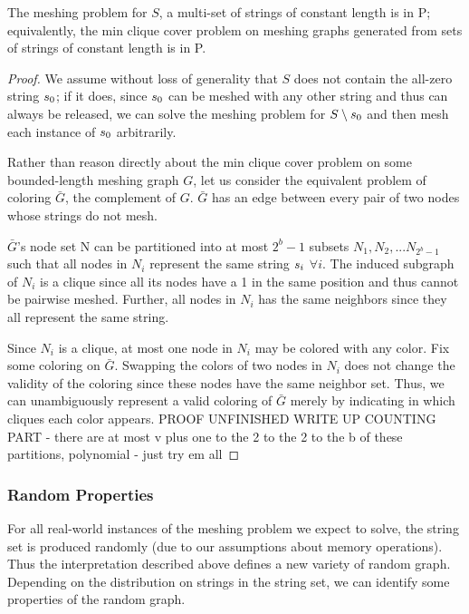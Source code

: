 \begin{theorem}
The meshing problem for $S$, a multi-set of strings of constant length is in P; equivalently, the min clique cover problem on meshing graphs generated from sets of strings of constant length is in P.
\end{theorem}
\begin{proof}
We assume without loss of generality that $S$ does not contain the all-zero string $s_0$; if it does, since $s_0$ can be meshed with any other string and thus can always be released, we can solve the meshing problem for $S \setminus s_0$ and then mesh each instance of $s_0$ arbitrarily.

Rather than reason directly about the min clique cover problem on some bounded-length meshing graph $G$, let us consider the equivalent problem of coloring $\bar{G}$, the complement of $G$.  $\bar{G}$ has an edge between  every pair of two nodes whose strings do not mesh.

$\bar{G}$'s node set N can be partitioned into at most $2^b-1$ subsets $N_1, N_2, ... N_{2^b-1}$ such that all nodes in $N_i$ represent the same string $s_i$ $\forall i$.  The induced subgraph of $N_i$ is a clique since all its nodes have a 1 in the same position and thus cannot be pairwise meshed.  Further, all nodes in $N_i$ has the same neighbors since they all represent the same string.

Since $N_i$ is a clique, at most one node in $N_i$ may be colored with any color.  Fix some coloring on $\bar{G}$.  Swapping the colors of two nodes in $N_i$ does not change the validity of the coloring since these nodes have the same neighbor set.  Thus, we can unambiguously represent a valid coloring of $\bar{G}$ merely by indicating in which cliques each color appears.
PROOF UNFINISHED WRITE UP COUNTING PART
- there are at most v plus one to the 2 to the 2 to the b of these partitions, polynomial
- just try em all
\end{proof}

\subsubsection{Random Properties}
For all real-world instances of the meshing problem we expect to solve, the string set is produced randomly (due to our assumptions about memory operations).  Thus the interpretation described above defines a new variety of random graph.  Depending on the distribution on strings in the string set, we can identify some properties of the random graph.

